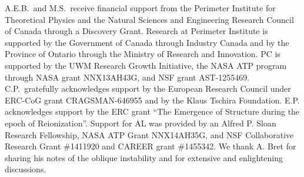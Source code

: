 \documentclass[usenatbib,iop,apj,numberedappendix]{aeb_emulateapj_2015}
\newcommand{\epm}{\ensuremath{e^{\pm}}}
\begin{document}

\acknowledgements
A.E.B.~and M.S.~receive financial support from the Perimeter
Institute for Theoretical Physics and the Natural Sciences and
Engineering Research Council of Canada through a Discovery Grant.
Research at Perimeter Institute is supported by the Government of
Canada through Industry Canada and by the Province of Ontario through
the Ministry of Research and Innovation.
PC is supported by the UWM Research Growth Initiative, the NASA ATP
program through NASA grant NNX13AH43G, and NSF grant AST-1255469.
C.P.~gratefully acknowledges support by the European Research Council under ERC-CoG grant CRAGSMAN-646955 and by the Klaus Tschira Foundation.
E.P. acknowledges support by the ERC grant ``The Emergence of Structure during the epoch of Reionization''. Support for AL was provided by an Alfred P. Sloan Research Fellowship, NASA ATP Grant NNX14AH35G, and NSF Collaborative Research Grant \#1411920 and CAREER grant \#1455342.
We thank A. Bret for sharing his notes of the oblique instability and for extensive and enlightening discussions. 
\end{document}
